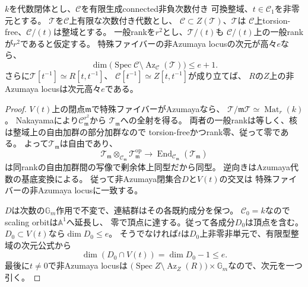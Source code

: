 \begin{lemma}
\label{lem:quotient-rees-azumaya}
$k$を代数閉体とし、$\mathcal C$を有限生成connected非負次数付き
可換整域、$t\in\mathcal C_1$を非零元とする。
$\mathcal T$を$\mathcal C$上有限な次数付き代数とし、
$\mathcal C\subset Z(\mathcal T)$、$\mathcal T$は
$\mathcal C$上torsion-free、$\mathcal C/(t)$は整域とする。
一般rankを$r^2$とし、$\mathcal T/(t)$も
$\mathcal C/(t)$上の一般rankが$r^2$であると仮定する。
特殊ファイバーの非Azumaya locusの次元が高々$e$なら、
\[
 \dim\bigl(\operatorname{Spec}\mathcal C
       \setminus\operatorname{Az}_{\mathcal C}(\mathcal T)\bigr)
 \le e+1.
\]
さらに$\mathcal T[t^{-1}]\simeq R[t,t^{-1}]$、
$\mathcal C[t^{-1}]\simeq Z[t,t^{-1}]$が成り立てば、
$R$の$Z$上の非Azumaya locusは次元高々$e$である。
\end{lemma}
\begin{proof}
$V(t)$上の閉点$\mathfrak m$で特殊ファイバーがAzumayaなら、
$\mathcal T/\mathfrak m\mathcal T\simeq\operatorname{Mat}_r(k)$。
Nakayamaにより$\mathcal C_{\mathfrak m}^{r^2}$から
$\mathcal T_{\mathfrak m}$への全射を得る。
両者の一般rankは等しく、核は整域上の自由加群の部分加群なので
torsion-freeかつrank零、従って零である。
よって$\mathcal T_{\mathfrak m}$は自由であり、
\[
 \mathcal T_{\mathfrak m}\otimes_{\mathcal C_{\mathfrak m}}
 \mathcal T_{\mathfrak m}^{\mathrm{op}}
 \longrightarrow
 \operatorname{End}_{\mathcal C_{\mathfrak m}}(\mathcal T_{\mathfrak m})
\]
は同rankの自由加群間の写像で剰余体上同型だから同型。
逆向きはAzumaya代数の基底変換による。
従って非Azumaya閉集合$D$と$V(t)$の交叉は
特殊ファイバーの非Azumaya locusに一致する。

$D$は次数の$\mathbb G_m$作用で不変で、連結群はその各既約成分を保つ。
$\mathcal C_0=k$なのでscaling orbitは$\mathbb A^1$へ延長し、
零で頂点に達する。従って各成分$D_0$は頂点を含む。
$D_0\subset V(t)$なら$\dim D_0\le e$。
そうでなければ$t$は$D_0$上非零非単元で、有限型整域の次元公式から
\[
 \dim(D_0\cap V(t))=\dim D_0-1\le e.
\]
最後に$t\ne0$で非Azumaya locusは
$\bigl(\operatorname{Spec}Z\setminus\operatorname{Az}_Z(R)\bigr)
\times\mathbb G_m$なので、次元を一つ引く。
\end{proof}

